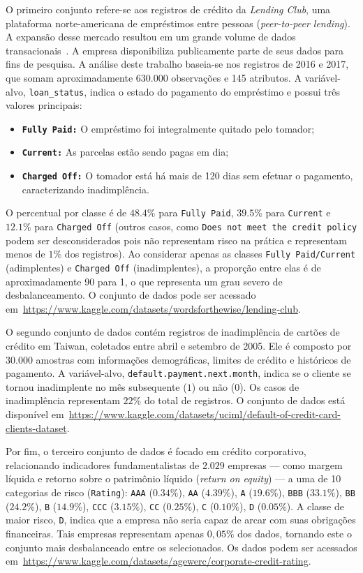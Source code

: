 O primeiro conjunto refere-se aos registros de crédito da \textit{Lending Club}, uma plataforma norte-americana de empréstimos entre pessoas (\textit{peer-to-peer lending}). A expansão desse mercado resultou em um grande volume de dados transacionais~\cite{Namvar2018}. A empresa disponibiliza publicamente parte de seus dados para fins de pesquisa. A análise deste trabalho baseia-se nos registros de 2016 e 2017, que somam aproximadamente \(630.000\) observações e 145 atributos. A variável-alvo, \texttt{loan\_status}, indica o estado do pagamento do empréstimo e possui três valores principais:
\begin{itemize}
  \item \textbf{\texttt{Fully Paid:}} O empréstimo foi integralmente quitado pelo tomador;
  \item \textbf{\texttt{Current:}} As parcelas estão sendo pagas em dia;
  \item \textbf{\texttt{Charged Off:}} O tomador está há mais de 120 dias sem efetuar o pagamento, caracterizando inadimplência.
\end{itemize}
O percentual por classe é de \(48.4\%\) para \texttt{Fully Paid}, \(39.5\%\) para \texttt{Current} e \(12.1\%\) para \texttt{Charged Off} (outros casos, como \texttt{Does not meet the credit policy} podem ser desconsiderados pois não representam risco na prática e representam menos de \(1\%\) dos registros). Ao considerar apenas as classes \texttt{Fully Paid/Current} (adimplentes) e \texttt{Charged Off} (inadimplentes), a proporção entre elas é de aproximadamente 90 para 1, o que representa um grau severo de desbalanceamento. O conjunto de dados pode ser acessado em~\url{https://www.kaggle.com/datasets/wordsforthewise/lending-club}.

O segundo conjunto de dados contém registros de inadimplência de cartões de crédito em Taiwan, coletados entre abril e setembro de 2005. Ele é composto por \(30.000\) amostras com informações demográficas, limites de crédito e históricos de pagamento. A variável-alvo, \texttt{default.payment.next.month}, indica se o cliente se tornou inadimplente no mês subsequente (\(1\)) ou não (\(0\)). Os casos de inadimplência representam \(22\%\) do total de registros. O conjunto de dados está disponível em~\url{https://www.kaggle.com/datasets/uciml/default-of-credit-card-clients-dataset}.

Por fim, o terceiro conjunto de dados é focado em crédito corporativo, relacionando indicadores fundamentalistas de \(2.029\) empresas — como margem líquida e retorno sobre o patrimônio líquido (\textit{return on equity}) — a uma de 10 categorias de risco (\texttt{Rating}): \texttt{AAA} (\(0.34\%\)), \texttt{AA} (\(4.39\%\)), \texttt{A} (\(19.6\%\)), \texttt{BBB} (\(33.1\%\)), \texttt{BB} (\(24.2\%\)), \texttt{B} (\(14.9\%\)), \texttt{CCC} (\(3.15\%\)), \texttt{CC} (\(0.25\%\)), \texttt{C} (\(0.10\%\)), \texttt{D} (\(0.05\%\)). A classe de maior risco, \texttt{D}, indica que a empresa não seria capaz de arcar com suas obrigações financeiras. Tais empresas representam apenas \(0,05\%\) dos dados, tornando este o conjunto mais desbalanceado entre os selecionados. Os dados podem ser acessados em~\url{https://www.kaggle.com/datasets/agewerc/corporate-credit-rating}.


